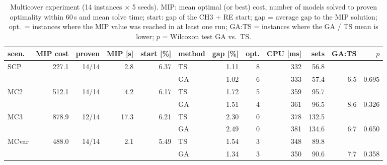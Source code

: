 \begin{table}[t]
\centering\footnotesize
\setlength{\tabcolsep}{4pt}
\caption{Multicover experiment (14 instances $\times$ 5 seeds). MIP: mean optimal (or best) cost, number of models solved to proven optimality within 60\,s and mean solve time; start: gap of the CH3 + RE start; gap = average gap to the MIP solution; opt.\ = instances where the MIP value was reached in at least one run; GA:TS = instances where the GA / TS mean is lower; $p$ = Wilcoxon test GA vs.\ TS.}
\label{tab:multicover}
\begin{tabular}{lrrrrlrrrrrr}
\toprule
scen. & MIP cost & proven & MIP [s] & start [\%] & method & gap [\%] & opt. & CPU [ms] & sets & GA:TS & $p$ \\
\midrule
\multirow{2}{*}{SCP} & \multirow{2}{*}{227.1} & \multirow{2}{*}{14/14} & \multirow{2}{*}{2.8} & \multirow{2}{*}{6.37} & TS & 1.11 & 8 & 332 & 56.8 &  &  \\
 & & & & & GA & 1.02 & 6 & 333 & 57.4 & 6:5 & 0.695 \\
\midrule
\multirow{2}{*}{MC2} & \multirow{2}{*}{512.1} & \multirow{2}{*}{14/14} & \multirow{2}{*}{4.2} & \multirow{2}{*}{6.17} & TS & 1.72 & 5 & 359 & 95.7 &  &  \\
 & & & & & GA & 1.51 & 4 & 361 & 96.5 & 8:6 & 0.326 \\
\midrule
\multirow{2}{*}{MC3} & \multirow{2}{*}{878.9} & \multirow{2}{*}{12/14} & \multirow{2}{*}{17.3} & \multirow{2}{*}{6.21} & TS & 2.30 & 0 & 378 & 132.5 &  &  \\
 & & & & & GA & 2.49 & 0 & 381 & 134.6 & 6:7 & 0.650 \\
\midrule
\multirow{2}{*}{MCvar} & \multirow{2}{*}{488.0} & \multirow{2}{*}{14/14} & \multirow{2}{*}{2.1} & \multirow{2}{*}{5.49} & TS & 1.54 & 3 & 348 & 89.8 &  &  \\
 & & & & & GA & 1.34 & 3 & 350 & 90.6 & 7:7 & 0.358 \\
\bottomrule
\end{tabular}
\end{table}
